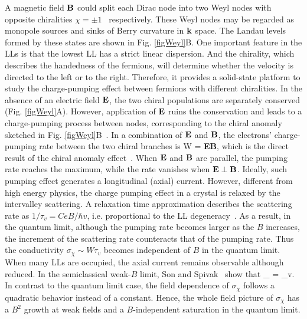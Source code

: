 A magnetic field $\bf B$ could split each Dirac node into two Weyl nodes with opposite chiralities $\chi=\pm 1$~\cite{Hosur2013,Wang2012} respectively. These Weyl nodes may be regarded as monopole sources and sinks of Berry curvature in $\bf k$ space. The Landau levels formed by these states are shown in Fig. \ref{figWeyl}B. One important feature in the LLs is that the lowest LL has a strict linear dispersion. And the chirality, which describes the handedness of the fermions, will determine whether the velocity is directed to the left or to the right. Therefore, it provides a solid-state platform to study the charge-pumping effect between fermions with different chiralities. In the absence of an electric field $\bf E$, the two chiral populations are separately conserved (Fig. \ref{figWeyl}A). However, application of $\bf E$ ruins the conservation and leads to a charge-pumping process between nodes, corresponding to the chiral anomaly sketched in Fig. \ref{figWeyl}B~\cite{Nielsen1983,Wan2011,Burkov2011,Son2013,Parameswaran2014,Hosur2013}. In a combination of $\bf E$ and $\bf B$, the electrons' charge-pumping rate between the two chiral branches is
\be
W = \chi{} {\bf E\cdot B},
\label{eq:W}
\ee
which is the direct result of the chiral anomaly effect~\cite{Burkov2011,Yang2011, Aji2012,Son2013,Parameswaran2014,Hosur2013}. When $\bf E$ and $\bf B$ are parallel, the pumping rate reaches the maximum, while the rate vanishes when $\bf E \perp \bf B$. Ideally, such pumping effect generates a longitudinal (axial) current. However, different from high energy physics, the charge pumping effect in a crystal is relaxed by the intervalley scattering. A relaxation time approximation describes the scattering rate as $1/\tau_v = CeB/\hbar v$, i.e. proportional to the LL degeneracy~\cite{Aji2012}. As a result, in the quantum limit, although the pumping rate becomes larger as the $B$ increases, the increment of the scattering rate counteracts that of the pumping rate. Thus the conductivity $\sigma_\chi\sim W\tau_v$ becomes independent of $B$ in the quantum limit. When many LLs are occupied, the axial current remains observable although reduced. In the semiclassical weak-$B$ limit, Son and Spivak~\cite{Son2013} show that
\be
\sigma_{\chi} = \tau_v.
\label{eq:SS}
\ee
In contrast to the quantum limit case, the field dependence of $\sigma_\chi$ follows a quadratic behavior instead of a constant. Hence, the whole field picture of $\sigma_\chi$ has a $B^2$ growth at weak fields and a $B$-independent saturation in the quantum limit.

